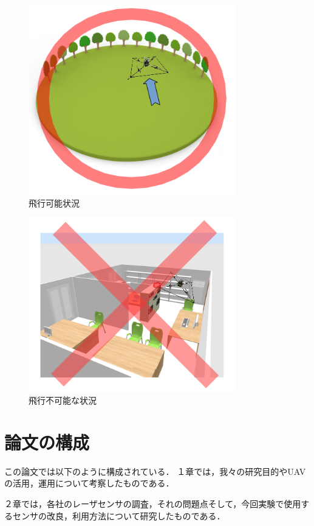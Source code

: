 \documentclass[12pt,oneside]{sotsuken_paper}
\begin{document}
\begin{figure}[H]
\begin{center}
\includegraphics[width=90mm]{img/hikou1.png}
\end{center}
\caption{飛行可能状況}
\label{fig:hikou1}
\end{figure}

\begin{figure}[H]
\begin{center}
\includegraphics[width=90mm]{img/hikou2.png}
\end{center}
\caption{飛行不可能な状況}
\label{fig:hikou2}
\end{figure}


\section{論文の構成}
この論文では以下のように構成されている．
１章では，我々の研究目的やUAVの活用，運用について考察したものである．


２章では，各社のレーザセンサの調査，それの問題点そして，今回実験で使用するセンサの改良，利用方法について研究したものである．
\end{document}
